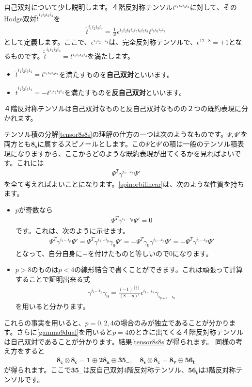 \documentclass[report,paper=a4, fontsize=12pt, line_length=16cm, number_of_lines=33,dvipdfmx]{jlreq}
\numberwithin{equation}{chapter}
\numberwithin{equation}{section}
\newcommand{\kyou}[1]{{\sffamily \bfseries #1}}
\newcommand{\triv}{\mathbf{1}}
\newcommand{\etv}{\mathbf{8_v}}
\newcommand{\ets}{\mathbf{8_s}}
\newcommand{\etc}{\mathbf{8_c}}
\newcommand{\tweta}{\mathbf{28_{a}}}
\newcommand{\thfvm}{\mathbf{35}_{-}}
\newcommand{\fsxt}{\mathbf{56_t}}
\begin{document}
自己双対について少し説明します。４階反対称テンソル$t^{i_1i_2i_3i_4}$に対して、そのHodge双対$\tilde{t}^{i_1i_2i_3i_4}$を
\begin{align}
  \tilde{t}^{i_1i_2i_3i_4}=\frac{1}{4!}\epsilon^{i_1i_2i_3i_4i_5i_6i_7i_8}t^{i_5i_6i_7i_8}
\end{align}
として定義します。ここで、$\epsilon^{i_1i_2\dots i_8}$は、完全反対称テンソルで、$\epsilon^{12\dots 8}=+1$となるものです。$\tilde{\tilde{t}}^{i_1i_2i_3i_4}=t^{i_1i_2i_3i_4}$を満たします。
\begin{itemize}
  \item $\tilde{t}^{i_1i_2i_3i_4}=t^{i_1i_2i_3i_4}$を満たすものを\kyou{自己双対}といいます。
  \item $\tilde{t}^{i_1i_2i_3i_4}=-t^{i_1i_2i_3i_4}$を満たすものを\kyou{反自己双対}といいます。
\end{itemize}
４階反対称テンソルは自己双対なものと反自己双対なものの２つの既約表現に分かれます。

テンソル積の分解\eqref{tensor8s8s}の理解の仕方の一つは次のようなものです。$\Psi,\Psi'$を両方とも$\ets$に属するスピノールとします。この$\Psi$と$\Psi'$の積は一般のテンソル積表現になりますから、ここからどのような既約表現が出てくるかを見ればよいです。これには
\begin{align}
  \Psi^{T}\gamma^{i_1\dots i_p}\Psi'
  \label{spinorbilinear}
\end{align}
を全て考えればよいことになります。\eqref{spinorbilinear}は、次のような性質を持ちます。
\begin{itemize}
  \item $p$が奇数なら
  \begin{align}
    \Psi^{T}\gamma^{i_1\dots i_p}\Psi'=0
  \end{align}
  です。これは、次のように示せます。
  \begin{align}
    \Psi^{T}\gamma^{i_1\dots i_p}\Psi'=
    \Psi^{T}\gamma^{i_1\dots i_p}\gamma_9\Psi'=
    -\Psi^{T}\gamma_9\gamma^{i_1\dots i_p}\Psi'=
    -\Psi^{T}\gamma^{i_1\dots i_p}\Psi'
  \end{align}
  となって、自分自身に$-$を付けたものと等しいので$0$になります。
  \item $p>8$のものは$p<4$の線形結合で書くことができます。これは頑張って計算することで証明出来る式
  \begin{align}
    \gamma^{i_1\dots i_p}\gamma_9=\frac{(-1)^{[\frac{p}{2}]}}{(8-p)!}\epsilon^{i_1\dots i_8}\gamma_{i_{p+1}\dots i_8}\label{gamma9dual}
  \end{align}
  を用いると分かります。
\end{itemize}
これらの事実を用いると、$p=0,2,4$の場合のみが独立であることが分かります。さらに\eqref{gamma9dual}を用いると$p=4$のときに出てくる４階反対称テンソルは自己双対であることが分かります。結果\eqref{tensor8s8s}が得られます。
同様の考え方をすると
\begin{align}
  \etc\otimes\etc=\triv \oplus \tweta \oplus \thfvm,\quad
  \ets\otimes\etc=\etv \oplus \fsxt
  \label{otherspinortensors}
\end{align}
が得られます。ここで$\thfvm$は反自己双対4階反対称テンソル、$\fsxt$は3階反対称テンソルです。
\end{document}

